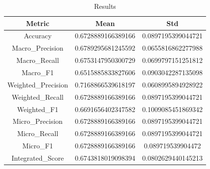 \begin{table}[htbp]
\centering
\caption{Results}
\label{tab:csv}
\small
\setlength{\tabcolsep}{4pt}
\begin{tabular}{|c|c|c|}
\hline
Metric & Mean & Std \\
\hline
Accuracy & 0.6728889166389166 & 0.0897195399044721 \\
Macro_Precision & 0.6789295681245592 & 0.0655816862277988 \\
Macro_Recall & 0.6753147950300729 & 0.0699797151251812 \\
Macro_F1 & 0.6515885833827606 & 0.0903042287135098 \\
Weighted_Precision & 0.7168866539618197 & 0.0608995894928922 \\
Weighted_Recall & 0.6728889166389166 & 0.0897195399044721 \\
Weighted_F1 & 0.6691656402347582 & 0.1009085451869342 \\
Micro_Precision & 0.6728889166389166 & 0.0897195399044721 \\
Micro_Recall & 0.6728889166389166 & 0.0897195399044721 \\
Micro_F1 & 0.6728889166389166 & 0.089719539904472 \\
Integrated_Score & 0.6743818019098394 & 0.0802629440145213 \\
\hline
\end{tabular}
\end{table}